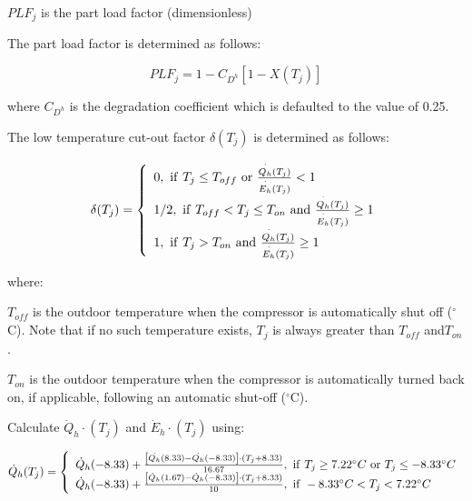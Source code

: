 \(PL{F_j}\) is the part load factor (dimensionless)

The part load factor is determined as follows:

\begin{equation}
PL{F_j} = 1 - {C_{{D^h}}}[1 - X({T_j})]
\end{equation}

where \({C_{{D^h}}}\) is the degradation coefficient which is defaulted to the value of 0.25.

The low temperature cut-out factor \(\delta ({T_j})\) is determined as follows:

\begin{equation}
\delta ({T_j}) = \left\{
    \begin{array}{l}
      {\rm{0,~if~}}{T_j} \le {T_{off}}{\rm{~or~}}\frac{{\mathop {{Q_h}}\limits^ \cdot  ({T_j})}}{{\mathop {{E_h}}\limits^ \cdot  ({T_j})}} < 1 \\
      {\rm{1/2,~if~}}{T_{off}} < {T_j} \le {T_{on}}{\rm{~and~}}\frac{{\mathop {{Q_h}}\limits^ \cdot  ({T_j})}}{{\mathop {{E_h}}\limits^ \cdot  ({T_j})}} \ge 1 \\
      {\rm{1,~if~}}{T_j} > {T_{on}}{\rm{~and~}}\frac{{\mathop {{Q_h}}\limits^ \cdot  ({T_j})}}{{\mathop {{E_h}}\limits^ \cdot  ({T_j})}} \ge 1
    \end{array}
  \right.
\end{equation}

where:

\({T_{off}}\) is the outdoor temperature when the compressor is automatically shut off (\(^{\circ}\)C). Note that if no such temperature exists, \({T_j}\) is always greater than \({T_{off}}\) and\({T_{on}}\).

\({T_{on}}\) is the outdoor temperature when the compressor is automatically turned back on, if applicable, following an automatic shut-off (\(^{\circ}\)C).

Calculate \(\dot{Q}_{h} \cdot ({T_j})\) and \(\dot{E}_{h} \cdot ({T_j})\) using:

\begin{equation}
\dot{Q}_{h}({T_j}) = \left\{ \begin{array}{l}\dot{Q}_{h}(-8.33) + \frac{{\left[ {\dot{{Q}_{h}}(8.33) - \dot{{Q_h}}(-8.33)} \right] \cdot \left( {{T_j} + 8.33} \right)}}{{16.67}}{\rm{,~if~}}{T_j} \ge 7.22^{\circ}C {\rm{~or~}}{T_j} \le  -8.33^{\circ}C \\
\dot{Q}_{h}(-8.33) + \frac{{\left[ {\dot{Q}_{h}(1.67) - \dot{Q}_{h}(-8.33)} \right] \cdot \left( {{T_j} + 8.33} \right)}}{{10}}{\rm{,~if~}} -8.33^{\circ}C < {T_j} < 7.22^{\circ}C\end{array} \right.
\end{equation}

